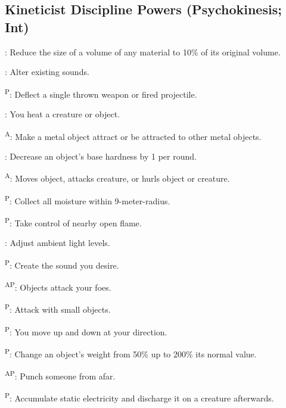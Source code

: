 \subsection{Kineticist Discipline Powers {\normalsize(Psychokinesis; Int)}}
\begin{enumerate*}
\item {}: Reduce the size of a volume of any material to 10\% of its original volume.

      : Alter existing sounds.

      \textsuperscript{P}: Deflect a single thrown weapon or fired projectile.

      : You heat a creature or object.

      \textsuperscript{A}: Make a metal object attract or be attracted to other metal objects.

      : Decrease an object's base hardness by 1 per round.

      \textsuperscript{A}: Moves object, attacks creature, or hurls object or creature.

\item {}\textsuperscript{P}: Collect all moisture within 9-meter-radius.

      \textsuperscript{P}: Take control of nearby open flame.

      : Adjust ambient light levels.

      \textsuperscript{P}: Create the sound you desire.
      
\item {}\textsuperscript{AP}: Objects attack your foes.

      \textsuperscript{P}: Attack with small objects.

      \textsuperscript{P}: You move up and down at your direction.

      \textsuperscript{P}: Change an object's weight from 50\% up to 200\% its normal value.

      \textsuperscript{AP}: Punch someone from afar.

      \textsuperscript{P}: Accumulate static electricity and discharge it on a creature afterwards.


\end{enumerate*}
